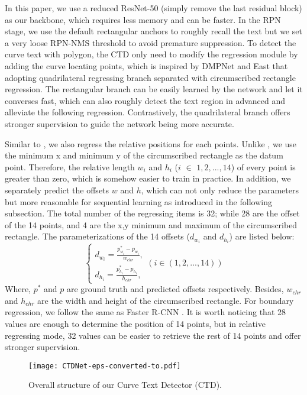 \documentclass[10pt,twocolumn,letterpaper]{article}
\begin{document}
In this paper, we use a reduced ResNet-50 (simply remove the last residual block) as our backbone, which requires less memory and can be faster. In the RPN stage, we use the default rectangular anchors to roughly recall the text but we set a very loose RPN-NMS threshold to avoid premature suppression.
To detect the curve text with polygon, the CTD only need to modify the regression module by adding the curve locating points, which is inspired by DMPNet \cite{liu2017deep} and East \cite{zhou2017east} that adopting quadrilateral regressing branch separated with circumscribed rectangle regression. The rectangular branch can be easily learned by the network and let it converses fast, which can also roughly detect the text region in advanced and alleviate the following regression. Contrastively, the quadrilateral branch offers stronger supervision to guide the network being more accurate.

Similar to \cite{ren2015faster,liu2017deep}, we also regress the relative positions for each points. Unlike \cite{liu2017deep}, we use the minimum x and minimum y of the circumscribed rectangle as the datum point. Therefore, the relative length $w_i$ and $h_i$ ($i$ $\in$ $1,2,...,14$) of every point is greater than zero, which is somehow easier to train in practice. In addition, we separately predict the offsets $w$ and $h$, which can not only reduce the parameters but more reasonable for sequential learning as introduced in the following subsection.
The total number of the regressing items is 32; while 28 are the offset of the 14 points, and 4 are the x,y minimum and maximum of the circumscribed rectangle. The parameterizations of the 14 offsets ($d_{w_{i}}$ and $d_{h_{i}}$) are listed below:
\begin{equation}\label{eq:regress}
  \left\{
          \begin{array}{ll}
            d_{w_{i}} = \frac{p^{*}_{w_{i}}-p_{w_{i}}}{w_{chr}}, \\
            d_{h_{i}} = \frac{p^{*}_{h_{i}}-p_{h_{i}}}{h_{chr}},
          \end{array}
        \right. (i\in (1,2,...,14))
\end{equation}
Where, $p^{*}$ and $p$ are ground truth and predicted offsets respectively. Besides, $w_{chr}$ and $h_{chr}$ are the width and height of the circumscribed rectangle. For boundary regression, we follow the same as Faster R-CNN \cite{ren2015faster}. It is worth noticing that 28 values are enough to determine the position of 14 points, but in relative regressing mode, 32 values can be easier to retrieve the rest of 14 points and offer stronger supervision.
\begin{figure*}[htb]
  \centering
  \centerline{\texttt{[image: CTDNet-eps-converted-to.pdf]}} \caption{Overall structure of our Curve Text Detector (CTD).  }\label{fig:net}
\end{figure*}
\end{document}
